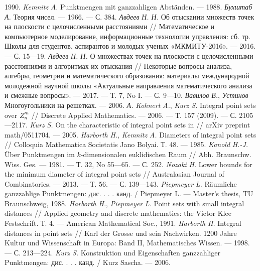 \begin{thebibliography}{99}
1990.
\emph{Kemnitz} \emph{A.} Punktmengen mit ganzzahligen
Abständen. — 1988.
\emph{Бухштаб} \emph{А.} Теория чисел. — 1966. — С. 384.
\emph{Авдеев} \emph{Н. Н.} Об отыскании множеств точек на
плоскости с целочисленными расстояниями // Математическое
и компьютерное моделирование, информационные технологии
управления: сб. тр. Школы для студентов, аспирантов и
молодых ученых «МКМИТУ-2016». — 2016. — С. 15—19.
\emph{Авдеев} \emph{Н. Н.} О множествах точек на
плоскости с целочисленными расстояниями и алгоритмах их
отыскания // Некоторые вопросы анализа, алгебры, геометрии
и математического образования: материалы международной
молодежной научной школы «Актуальные направления
математического анализа и смежные вопросы». — 2017. — Т. 7,
No I. — С. 9—10.
\emph{Вавилов} \emph{В.}, \emph{Устинов}
Многоугольники на решетках. — 2006.
\emph{А.}
\emph{Kohnert} \emph{A.}, \emph{Kurz} \emph{S.} Integral
point sets over $Z^m_n$
// Discrete Applied Mathematics. — 2006. —
Т. 157 (2009). — С. 2105—2117.
\emph{Kurz} \emph{S.} On the characteristic of integral point
sets in // arXiv preprint math/0511704. — 2005.
\emph{Harborth} \emph{H.}, \emph{Kemnitz} \emph{A.}
Diameters of integral point sets // Colloquia Mathematica
Societatis Jano Bolyai. Т. 48. — 1985.
\emph{Kanold}
\emph{H.-J.}
Über
Punktmengen
im
$k$-dimensionalen euklidischen Raum // Abh. Braunschw. Wiss.
Ges. — 1981. — Т. 32, No 55—65. — С. 252.
\emph{Nozaki} \emph{H.} Lower bounds for the minimum
diameter of integral point sets // Australasian Journal of
Combinatorics. — 2013. — Т. 56. — С. 139—143.
\emph{Piepmeyer}
\emph{L.}
Räumliche
ganzzahlige
Punktmengen: дис. . . . канд. / Piepmeyer L. — Master’s
thesis, TU Braunschweig, 1988.
\emph{Harborth} \emph{H.}, \emph{Piepmeyer} \emph{L.}
Point sets with small integral distances // Applied geometry and
discrete mathematics: the Victor Klee Festschrift. Т. 4. — American
Mathematical Soc., 1991.
\emph{Harborth} \emph{H.} Integral distances in point sets //
Karl der Grosse und sein Nachwirken. 1200 Jahre Kultur und
Wissenschaft in Europa: Band II, Mathematisches Wissen. —
1998. — С. 213—224.
\emph{Kurz} \emph{S.} Konstruktion und Eigenschaften
ganzzahliger Punktmengen: дис. . . . канд. / Kurz Sascha. — 2006.

\end{thebibliography}
